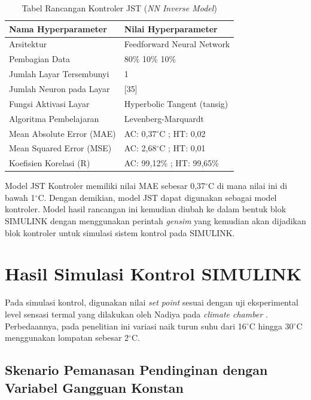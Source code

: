 \begin{table}[!h]
	\caption{Tabel Rancangan Kontroler JST (\textit{NN Inverse Model})}
	\label{tbl:5:NNControl}
	\centering
	\begin{tabular}{|p{5.7cm}|p{5cm}|}
		\hline
		\textbf{Nama Hyperparameter} & \textbf{Nilai Hyperparameter} \\ \hline
		Arsitektur & Feedforward Neural Network \\ \hline
		Pembagian Data & 80\% 10\% 10\% \\ \hline 
		Jumlah Layar Tersembunyi & 1 \\ \hline
		Jumlah Neuron pada Layar & [35] \\ \hline
		Fungsi Aktivasi Layar & Hyperbolic Tangent (tansig) \\ \hline
		Algoritma Pembelajaran & Levenberg-Marquardt \\ \hline
		Mean Absolute Error (MAE) & AC: 0,37$^\circ$C ; HT: 0,02\\ \hline
		Mean Squared Error (MSE) & AC: 2,68$^\circ$C ; HT: 0,01\\ \hline
		Koefisien Korelasi (R) & AC: 99,12\% ; HT: 99,65\% \\ \hline
	\end{tabular}
\end{table}

Model JST Kontroler memiliki nilai MAE sebesar 0,37$^\circ$C di mana nilai ini di bawah 1$^\circ$C. Dengan demikian, model JST dapat digunakan sebagai model kontroler. Model hasil rancangan ini kemudian diubah ke dalam bentuk blok SIMULINK dengan menggunakan perintah \textit{gensim} yang kemudian akan dijadikan blok kontroler untuk simulasi sistem kontrol pada SIMULINK.

\section{Hasil Simulasi Kontrol SIMULINK}

Pada simulasi kontrol, digunakan nilai \textit{set point} sesuai dengan uji eksperimental level sensasi termal yang dilakukan oleh Nadiya pada \textit{climate chamber} \cite{skripsiMuna}. Perbedaannya, pada penelitian ini variasi naik turun suhu dari 16$^\circ$C hingga 30$^\circ$C menggunakan lompatan sebesar 2$^\circ$C.

\subsection{Skenario Pemanasan Pendinginan dengan Variabel Gangguan Konstan}

